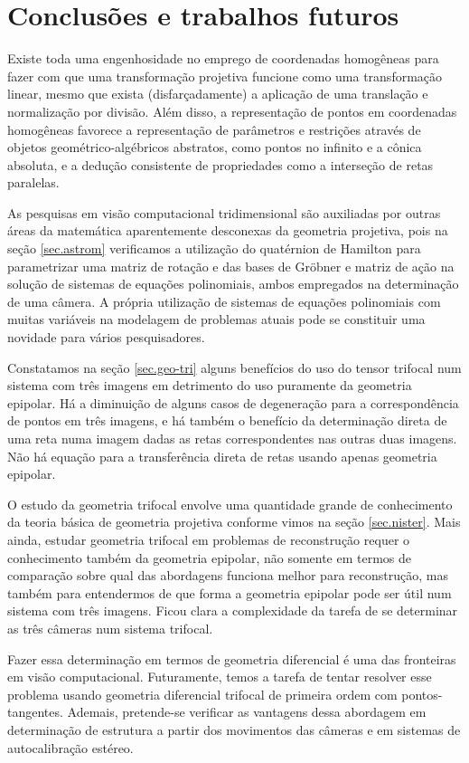 \newpage
\section{Conclusões e trabalhos futuros}

Existe toda uma engenhosidade no emprego de coordenadas homogêneas para fazer com que uma transformação projetiva funcione como uma transformação linear, mesmo que exista (disfarçadamente) a aplicação de uma translação e normalização por divisão. Além disso, a representação de pontos em coordenadas homogêneas favorece a representação de parâmetros e restrições através de objetos geométrico-algébricos abstratos, como pontos no infinito e a cônica absoluta, e a dedução consistente de propriedades como a interseção de retas paralelas.

As pesquisas em visão computacional tridimensional são auxiliadas por outras áreas da matemática aparentemente desconexas da geometria projetiva, pois na seção \ref{sec.astrom} verificamos a utilização do quatérnion de Hamilton para parametrizar uma matriz de rotação e das bases de Gr\"obner e matriz de ação na solução de sistemas de equações polinomiais, ambos empregados na determinação de uma câmera. A própria utilização de sistemas de equações polinomiais com muitas variáveis na modelagem de problemas atuais pode se constituir uma novidade para vários pesquisadores.

Constatamos na seção \ref{sec.geo-tri} alguns benefícios do uso do tensor trifocal num sistema com três imagens em detrimento do uso puramente da geometria epipolar. Há a diminuição de alguns casos de degeneração para a correspondência de pontos em três imagens, e há também o benefício da determinação direta de uma reta numa imagem dadas as retas correspondentes nas outras duas imagens. Não há equação para a transferência direta de retas usando apenas geometria epipolar.

O estudo da geometria trifocal envolve uma quantidade grande de conhecimento da teoria básica de geometria projetiva conforme vimos na seção \ref{sec.nister}. Mais ainda, estudar geometria trifocal em problemas de reconstrução requer o conhecimento também da geometria epipolar, não somente em termos de comparação sobre qual das abordagens funciona melhor para reconstrução, mas também para entendermos de que forma a geometria epipolar pode ser útil num sistema com três imagens. Ficou clara a complexidade da tarefa de se determinar as três câmeras num sistema trifocal.

Fazer essa determinação em termos de geometria diferencial é uma das fronteiras em visão computacional. Futuramente, temos a tarefa de tentar resolver esse problema usando geometria diferencial trifocal de primeira ordem com pontos-tangentes. Ademais, pretende-se verificar as vantagens dessa abordagem em determinação de estrutura a partir dos movimentos das câmeras e em sistemas de autocalibração estéreo.

